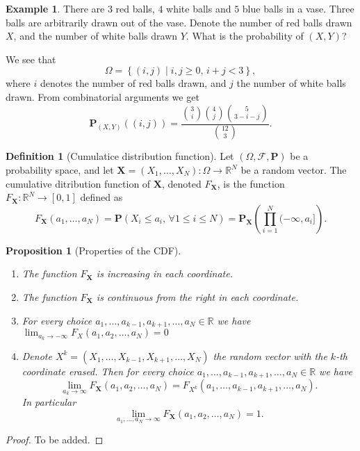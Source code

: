 \documentclass[11pt,a4paper]{article}
\theoremstyle{definition}
\newtheorem{definition}{Definition}[section]
\newtheorem{example}{Example}[section]
\theoremstyle{plain}
\newtheorem{proposition}[theorem]{Proposition}
\newcommand{\R}{\mathbb{R}}
\newcommand{\Prob}{\mathbf{P}}
\newcommand{\set}[2]{ \left\{ #1 \mid #2 \right\} }
\renewcommand{\vec}[1]{\boldsymbol{\mathbf{#1}}}
\begin{document}
  \begin{example}
    There are $3$ red balls, $4$ white balls and $5$ blue balls in a vase.
    Three balls are arbitrarily drawn out of the vase.
    Denote the number of red balls drawn $X$, and the number of white
    balls drawn $Y$. What is the probability of $(X,Y)$?

    We see that
    \[
      \Omega = \set{(i,j)}{i,j \geq 0,\, i + j < 3},
    \]
    where $i$ denotes the number of red balls drawn, and $j$ the number
    of white balls drawn. From combinatorial arguments we get
    \[
      \Prob_{(X,Y)}\left((i,j)\right) =
      \frac{\binom{3}{i}\binom{4}{j}\binom{5}{3-i-j}}{\binom{12}{3}}.
    \]
  \end{example}

  \begin{definition}[Cumulatice distribution function]
    Let $(\Omega, \mathcal F, \Prob)$ be a probability space, 
    and let $\vec{X} = (X_1,\dots,X_N) \colon \Omega \to \R^N$ be a random vector.
    The cumulative ditribution function of $\vec{X}$, denoted $F_{\vec{X}}$, 
    is the function $F_{\vec{X}} \colon \R^N \to [0,1]$ defined as
    \[
      F_{\vec{X}}(a_1,\dots,a_N) =
      \Prob(X_i \le a_i,\, \forall 1 \le i \le N) =
      \Prob_{\vec{X}}\left(\prod_{i=1}^{N}(-\infty,a_i]\right).
    \]
  \end{definition}

  \begin{proposition}[Properties of the CDF]
    \begin{enumerate}
      \item The function $F_{\vec{X}}$ is increasing in each coordinate.
      \item The function $F_{\vec{X}}$ is continuous from the right in each 
        coordinate.
      \item For every choice $a_1,\dots,a_{k-1},a_{k+1},\dots,a_N \in \R$
        we have $\lim_{a_k \to -\infty}{F_X(a_1,a_2,\dots,a_N)} = 0$
      \item Denote $X^k = (X_1,\dots,X_{k-1},X_{k+1},\dots,X_N)$ the random 
      vector with the $k$-th coordinate erased. 
      Then for every choice $a_1,\dots,a_{k-1},a_{k+1},\dots,a_N \in \R$
      we have
      \[
        \lim_{a_k \to \infty} F_{\vec{X}}(a_1,a_2,\dots,a_N) =
        F_{X^k}(a_1,\dots,a_{k-1},a_{k+1},\dots,a_N).
      \]
      In particular
      \[
        \lim_{a_1,\dots,a_N \to \infty} F_{\vec{X}}(a_1,a_2,\dots,a_N) = 1.
      \]
    \end{enumerate}
  \end{proposition}
  \begin{proof}
    To be added.
  \end{proof}
\end{document}
